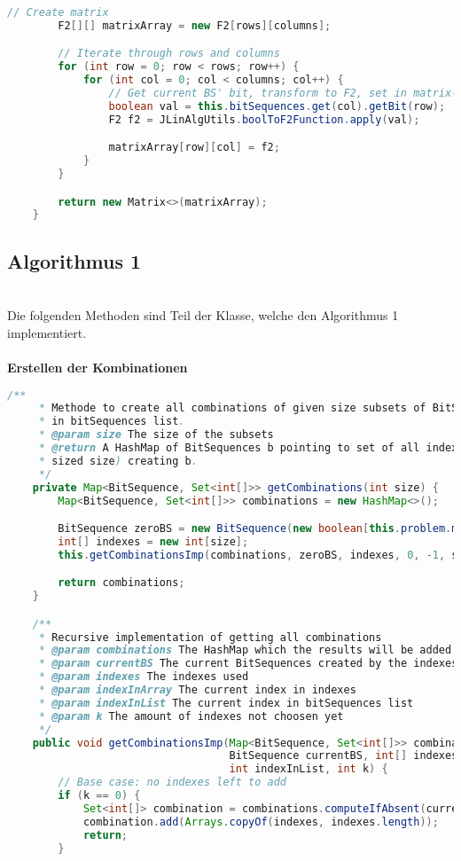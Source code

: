 \documentclass[a4paper,10pt,ngerman]{scrartcl}
\begin{document}
{\begin{lstlisting}[language=Java]
        // Create matrix
        F2[][] matrixArray = new F2[rows][columns];

        // Iterate through rows and columns
        for (int row = 0; row < rows; row++) {
            for (int col = 0; col < columns; col++) {
                // Get current BS' bit, transform to F2, set in matrix-array
                boolean val = this.bitSequences.get(col).getBit(row);
                F2 f2 = JLinAlgUtils.boolToF2Function.apply(val);

                matrixArray[row][col] = f2;
            }
        }

        return new Matrix<>(matrixArray);
    }
\end{lstlisting}


\subsection{Algorithmus 1}
\\Die folgenden Methoden sind Teil der Klasse, welche den Algorithmus 1 implementiert.
\\\\
\textbf{Erstellen der Kombinationen} \\
\begin{lstlisting}[language=Java]
		/**
     * Methode to create all combinations of given size subsets of BitSequences
     * in bitSequences list.
     * @param size The size of the subsets
     * @return A HashMap of BitSequences b pointing to set of all indexes (int-arrays
     * sized size) creating b.
     */
    private Map<BitSequence, Set<int[]>> getCombinations(int size) {
        Map<BitSequence, Set<int[]>> combinations = new HashMap<>();

        BitSequence zeroBS = new BitSequence(new boolean[this.problem.m]);
        int[] indexes = new int[size];
        this.getCombinationsImp(combinations, zeroBS, indexes, 0, -1, size);

        return combinations;
    }

    /**
     * Recursive implementation of getting all combinations
     * @param combinations The HashMap which the results will be added to
     * @param currentBS The current BitSequences created by the indexes
     * @param indexes The indexes used
     * @param indexInArray The current index in indexes
     * @param indexInList The current index in bitSequences list
     * @param k The amount of indexes not choosen yet
     */
    public void getCombinationsImp(Map<BitSequence, Set<int[]>> combinations,
                                   BitSequence currentBS, int[] indexes, int indexInArray,
                                   int indexInList, int k) {
        // Base case: no indexes left to add
        if (k == 0) {
            Set<int[]> combination = combinations.computeIfAbsent(currentBS, k1 -> new HashSet<>());
            combination.add(Arrays.copyOf(indexes, indexes.length));
            return;
        }


\end{lstlisting}}
\end{document}
